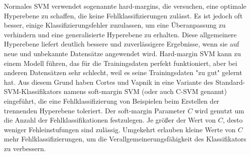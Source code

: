 \begin{figure}[h] 
\label{fig:kernel_trick} \end{figure} %

Normales SVM verwendet sogenannte hard-margins, die versuchen, eine optimale Hyperebene zu schaffen, die keine Fehlklassifizierungen zulässt. 
Es ist jedoch oft besser, einige Klassifizierungsfehler zuzulassen, um eine Überanpassung zu verhindern und eine generalisierte Hyperebene zu erhalten. Diese allgemeinere Hyperebene liefert deutlich bessere und zuverlässigere Ergebnisse, wenn sie auf neue und unbekannte Datensätze angewendet wird.
Hard-margin SVM kann zu einem Modell führen, das für die Trainingsdaten perfekt funktioniert, aber bei anderen Datensätzen sehr schlecht, weil es seine Trainingsdaten "zu gut" gelernt hat.
Aus diesem Grund haben Cortes und Vapnik in \cite{svn1995} eine Variante des Standard-SVM-Klassifikators namens soft-margin SVM (oder auch C-SVM genannt) eingeführt, die eine Fehlklassifizierung von Beispielen beim Erstellen der trennenden Hyperebene toleriert.
Der soft-margin Parameter $C$ wird genutzt um die Anzahl der Fehlklassifikationen festzulegen.
Je größer der Wert von $C$, desto weniger Fehleinstufungen sind zulässig.
Umgekehrt erlauben kleine Werte von $C$ mehr Fehlklassifizierungen, um die Verallgemeinerungsfähigkeit des Klassifikators zu verbessern. \\


